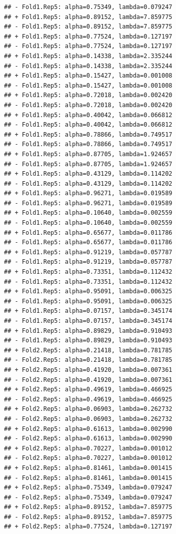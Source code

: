 \documentclass[
]{article}
\begin{document}
\begin{verbatim}
## - Fold1.Rep5: alpha=0.75349, lambda=0.079247 
## + Fold1.Rep5: alpha=0.89152, lambda=7.859775 
## - Fold1.Rep5: alpha=0.89152, lambda=7.859775 
## + Fold1.Rep5: alpha=0.77524, lambda=0.127197 
## - Fold1.Rep5: alpha=0.77524, lambda=0.127197 
## + Fold1.Rep5: alpha=0.14338, lambda=2.335244 
## - Fold1.Rep5: alpha=0.14338, lambda=2.335244 
## + Fold1.Rep5: alpha=0.15427, lambda=0.001008 
## - Fold1.Rep5: alpha=0.15427, lambda=0.001008 
## + Fold1.Rep5: alpha=0.72018, lambda=0.002420 
## - Fold1.Rep5: alpha=0.72018, lambda=0.002420 
## + Fold1.Rep5: alpha=0.40042, lambda=0.066812 
## - Fold1.Rep5: alpha=0.40042, lambda=0.066812 
## + Fold1.Rep5: alpha=0.78866, lambda=0.749517 
## - Fold1.Rep5: alpha=0.78866, lambda=0.749517 
## + Fold1.Rep5: alpha=0.87705, lambda=1.924657 
## - Fold1.Rep5: alpha=0.87705, lambda=1.924657 
## + Fold1.Rep5: alpha=0.43129, lambda=0.114202 
## - Fold1.Rep5: alpha=0.43129, lambda=0.114202 
## + Fold1.Rep5: alpha=0.96271, lambda=0.019589 
## - Fold1.Rep5: alpha=0.96271, lambda=0.019589 
## + Fold1.Rep5: alpha=0.10640, lambda=0.002559 
## - Fold1.Rep5: alpha=0.10640, lambda=0.002559 
## + Fold1.Rep5: alpha=0.65677, lambda=0.011786 
## - Fold1.Rep5: alpha=0.65677, lambda=0.011786 
## + Fold1.Rep5: alpha=0.91219, lambda=0.057787 
## - Fold1.Rep5: alpha=0.91219, lambda=0.057787 
## + Fold1.Rep5: alpha=0.73351, lambda=0.112432 
## - Fold1.Rep5: alpha=0.73351, lambda=0.112432 
## + Fold1.Rep5: alpha=0.95091, lambda=0.006325 
## - Fold1.Rep5: alpha=0.95091, lambda=0.006325 
## + Fold1.Rep5: alpha=0.07157, lambda=0.345174 
## - Fold1.Rep5: alpha=0.07157, lambda=0.345174 
## + Fold1.Rep5: alpha=0.89829, lambda=0.910493 
## - Fold1.Rep5: alpha=0.89829, lambda=0.910493 
## + Fold2.Rep5: alpha=0.21418, lambda=0.781785 
## - Fold2.Rep5: alpha=0.21418, lambda=0.781785 
## + Fold2.Rep5: alpha=0.41920, lambda=0.007361 
## - Fold2.Rep5: alpha=0.41920, lambda=0.007361 
## + Fold2.Rep5: alpha=0.49619, lambda=0.466925 
## - Fold2.Rep5: alpha=0.49619, lambda=0.466925 
## + Fold2.Rep5: alpha=0.06903, lambda=0.262732 
## - Fold2.Rep5: alpha=0.06903, lambda=0.262732 
## + Fold2.Rep5: alpha=0.61613, lambda=0.002990 
## - Fold2.Rep5: alpha=0.61613, lambda=0.002990 
## + Fold2.Rep5: alpha=0.70227, lambda=0.001012 
## - Fold2.Rep5: alpha=0.70227, lambda=0.001012 
## + Fold2.Rep5: alpha=0.81461, lambda=0.001415 
## - Fold2.Rep5: alpha=0.81461, lambda=0.001415 
## + Fold2.Rep5: alpha=0.75349, lambda=0.079247 
## - Fold2.Rep5: alpha=0.75349, lambda=0.079247 
## + Fold2.Rep5: alpha=0.89152, lambda=7.859775 
## - Fold2.Rep5: alpha=0.89152, lambda=7.859775 
## + Fold2.Rep5: alpha=0.77524, lambda=0.127197 

\end{verbatim}
\end{document}
